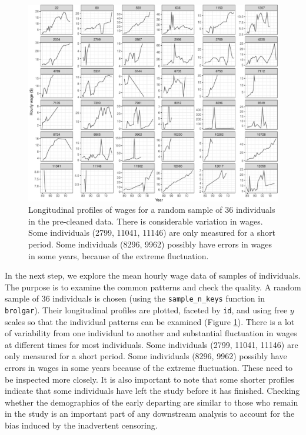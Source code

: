 \documentclass[12pt]{article}
\begin{document}
\begin{figure}

{\centering \includegraphics[width=1\linewidth]{figures/sample-plot-1}

}

\caption{Longitudinal profiles of wages for a random sample of 36 individuals in the pre-cleaned data. There is considerable variation in wages. Some individuals  (2799, 11041, 11146) are only measured for a short period. Some individuals (8296, 9962) possibly have errors in wages in some years, because of the extreme fluctuation.}\label{fig:sample-plot}
\end{figure}

In the next step, we explore the mean hourly wage data of samples of individuals. The purpose is to examine the common patterns and check the quality. A random sample of 36 individuals is chosen (using the \texttt{sample\_n\_keys} function in \texttt{brolgar}). Their longitudinal profiles are plotted, faceted by \texttt{id}, and using free \(y\) scales so that the individual patterns can be examined (Figure \ref{fig:sample-plot}). There is a lot of variability from one individual to another and substantial fluctuation in wages at different times for most individuals. Some individuals (2799, 11041, 11146) are only measured for a short period. Some individuals (8296, 9962) possibly have errors in wages in some years because of the extreme fluctuation. These need to be inspected more closely. It is also important to note that some shorter profiles indicate that some individuals have left the study before it has finished. Checking whether the demographics of the early departing are similar to those who remain in the study is an important part of any downstream analysis to account for the bias induced by the inadvertent censoring.
\end{document}
